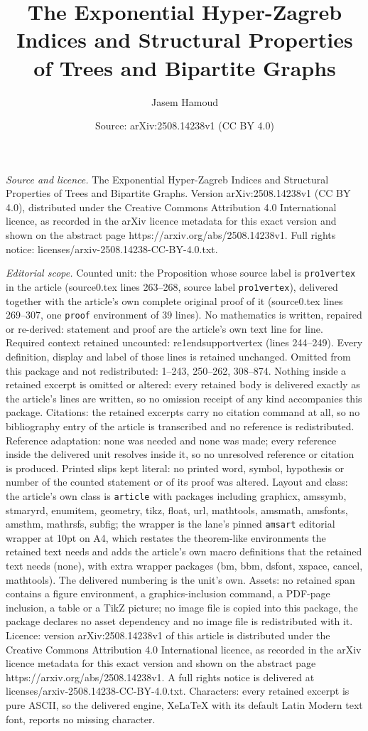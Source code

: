 \documentclass[10pt,a4paper]{amsart}
\title[The Exponential Hyper-Zagreb Indices and Structural Properti]{The Exponential Hyper-Zagreb Indices and Structural Properties of Trees and Bipartite Graphs}
\author{Jasem Hamoud}
\date{Source: arXiv:2508.14238v1 (CC BY 4.0)}
\begin{document}
\maketitle

\noindent\emph{Source and licence.} The Exponential Hyper-Zagreb Indices and Structural Properties of Trees and Bipartite Graphs. Version arXiv:2508.14238v1 (CC BY 4.0), distributed under the Creative Commons Attribution 4.0 International licence, as recorded in the arXiv licence metadata for this exact version and shown on the abstract page https://arxiv.org/abs/2508.14238v1. Full rights notice: licenses/arxiv-2508.14238-CC-BY-4.0.txt.\par\smallskip

\noindent\textit{Editorial scope.} Counted unit: the Proposition whose source label is \texttt{pro1vertex} in the article (source0.tex lines 263--268, source label \texttt{pro1vertex}), delivered together with the article's own complete original proof of it (source0.tex lines 269--307, one \texttt{proof} environment of 39 lines). No mathematics is written, repaired or re-derived: statement and proof are the article's own text line for line. Required context retained uncounted: re1endsupportvertex (lines 244--249). Every definition, display and label of those lines is retained unchanged. Omitted from this package and not redistributed: 1--243, 250--262, 308--874. Nothing inside a retained excerpt is omitted or altered: every retained body is delivered exactly as the article's lines are written, so no omission receipt of any kind accompanies this package. Citations: the retained excerpts carry no citation command at all, so no bibliography entry of the article is transcribed and no reference is redistributed. Reference adaptation: none was needed and none was made; every reference inside the delivered unit resolves inside it, so no unresolved reference or citation is produced. Printed slips kept literal: no printed word, symbol, hypothesis or number of the counted statement or of its proof was altered. Layout and class: the article's own class is \texttt{article} with packages including graphicx, amssymb, stmaryrd, enumitem, geometry, tikz, float, url, mathtools, amsmath, amsfonts, amsthm, mathrsfs, subfig; the wrapper is the lane's pinned \texttt{amsart} editorial wrapper at 10pt on A4, which restates the theorem-like environments the retained text needs and adds the article's own macro definitions that the retained text needs (none), with extra wrapper packages (bm, bbm, dsfont, xspace, cancel, mathtools). The delivered numbering is the unit's own. Assets: no retained span contains a figure environment, a graphics-inclusion command, a PDF-page inclusion, a table or a TikZ picture; no image file is copied into this package, the package declares no asset dependency and no image file is redistributed with it. Licence: version arXiv:2508.14238v1 of this article is distributed under the Creative Commons Attribution 4.0 International licence, as recorded in the arXiv licence metadata for this exact version and shown on the abstract page https://arxiv.org/abs/2508.14238v1. A full rights notice is delivered at licenses/arxiv-2508.14238-CC-BY-4.0.txt. Characters: every retained excerpt is pure ASCII, so the delivered engine, XeLaTeX with its default Latin Modern text font, reports no missing character.
\end{document}
